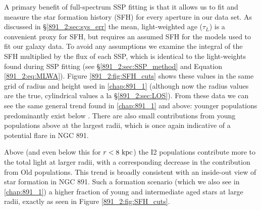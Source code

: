 A primary benefit of full-spectrum SSP fitting is that it allows us to
fit and measure the star formation history (SFH) for every aperture in
our data set. As discussed in \S\ref{891_2:sec:sys_err} the mean,
light-weighted age ($\tau_L$) is a convenient proxy for SFH, but
requires an assumed SFH for the models used to fit our galaxy data. To
avoid any assumptions we examine the integral of the SFH multiplied by
the flux of each SSP, which is identical to the light-weights found
during SSP fitting (see \S\ref{891_2:sec:SSP_method} and Equation
\ref{891_2:eq:MLWA}). Figure \ref{891_2:fig:SFH_cuts} shows these values in the
same grid of radius and height used in \ref{chap:891_1}
(although now the radius values are the true, cylindrical values a la
\S\ref{891_2:sec:LOS}). From these data we can see the same general trend
found in \ref{chap:891_1} and above: younger populations
predominantly exist below . There are also small
contributions from young populations above  at the
largest radii, which is once again indicative of a potential flare in
NGC 891.

Above  (and even below this for $r < 8~\mathrm{kpc} $) the
I2 populations contribute more to the total light at larger radii,
with a corresponding decrease in the contribution from Old
populations. This trend is broadly consistent with an inside-out view
of star formation in NGC 891. Such a formation scenario (which we also
see in \ref{chap:891_1}) a higher fraction of young and
intermediate aged stars at large radii, exactly as seen in Figure
\ref{891_2:fig:SFH_cuts}.




